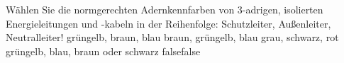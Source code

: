     {Wählen Sie die normgerechten Adernkennfarben von 3-adrigen, isolierten Energieleitungen und -kabeln in der Reihenfolge: Schutzleiter, Außenleiter, Neutralleiter!}
    {grüngelb, braun, blau}
    {braun, grüngelb, blau}
    {grau, schwarz, rot}
    {grüngelb, blau, braun oder schwarz}
    {false}{false}